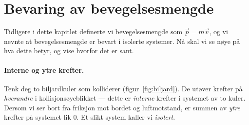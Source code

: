 \section{Bevaring av bevegelsesmengde}
\label{sec:bevaring}

Tidligere i dette kapitlet definerte vi bevegelsesmengde som $\vec{p} = m\vec{v}$, og vi nevnte at bevegelsesmengde er bevart i isolerte systemer. Nå skal vi se nøye på hva dette betyr, og vise hvorfor det er sant.

\paragraph*{Interne og ytre krefter.}
Tenk deg to biljardkuler som kolliderer (figur~\ref{fig:biljard}). De utøver krefter på \textit{hverandre} i kollisjonsøyeblikket — dette er \textit{interne} krefter i systemet av to kuler. Dersom vi ser bort fra friksjon mot bordet og luftmotstand, er summen av \textit{ytre} krefter på systemet lik 0. Et slikt system kaller vi \textit{isolert}.

